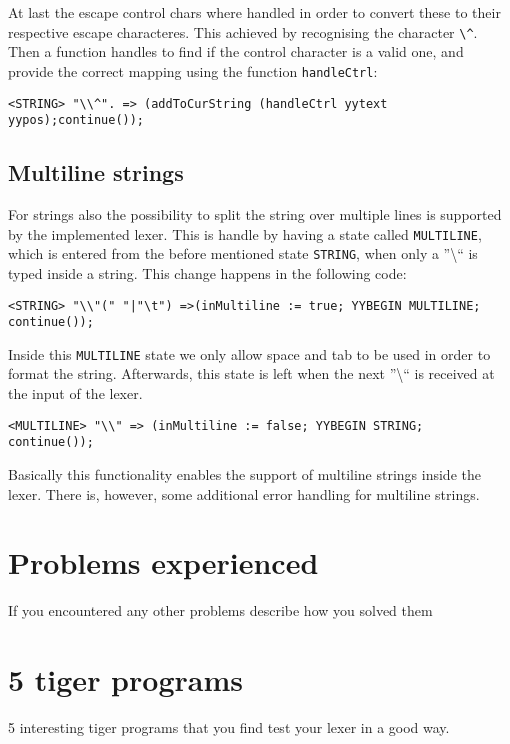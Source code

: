 \documentclass{article}
\begin{document}
At last the escape control chars where handled in order to convert these to their respective escape characteres. This achieved by recognising the character \texttt{\textbackslash \^}. Then a function handles to find if the control character is a valid one, and provide the correct mapping using the function \texttt{handleCtrl}:

\begin{lstlisting}[frame=single]
<STRING> "\\^". => (addToCurString (handleCtrl yytext yypos);continue());
\end{lstlisting}

\subsection{Multiline strings}
For strings also the possibility to split the string over multiple lines is supported by the implemented lexer. This is handle by having a state called \texttt{MULTILINE}, which is entered from the before mentioned state \texttt{STRING}, when only a ''\textbackslash`` is typed inside a string. This change happens in the following code:

\begin{lstlisting}[frame=single]
<STRING> "\\"(" "|"\t") =>(inMultiline := true; YYBEGIN MULTILINE; continue());
\end{lstlisting}

Inside this \texttt{MULTILINE} state we only allow space and tab to be used in order to format the string.
Afterwards, this state is left when the next ''\textbackslash`` is received at the input of the lexer. 
\begin{lstlisting}[frame=single]
<MULTILINE> "\\" => (inMultiline := false; YYBEGIN STRING; continue());
\end{lstlisting}

Basically this functionality enables the support of multiline strings inside the lexer. There is, however, some additional error handling for multiline strings.

\section{Problems experienced}
If you encountered any other problems describe how you solved them

\section{5 tiger programs}
5 interesting tiger programs that you find test your lexer in a good way.
\end{document}
